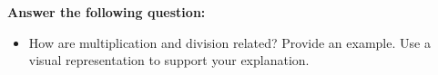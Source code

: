 \documentclass[12pt]{article}
\begin{document}

\begin{tcolorbox}[colframe=black!60, colback=white, 
coltitle=black, colbacktitle=black!15, fonttitle=\bfseries\Large, 
title=Exit Ticket, halign title=center, left=10pt, right=10pt, top=10pt, bottom=15pt]
\textbf{Answer the following question:}
\begin{itemize}
    \item How are multiplication and division related? Provide an example. Use a visual representation to support your explanation.
\end{itemize}
\vspace{1cm}
\end{tcolorbox}
\end{document}
